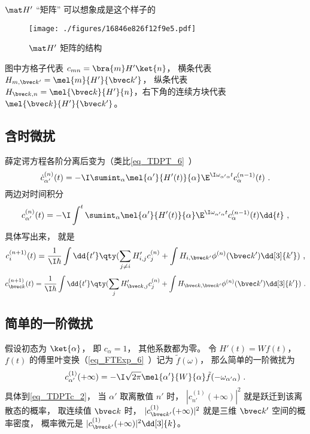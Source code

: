 $\mat H'$  “矩阵” 可以想象成是这个样子的
\begin{figure}[ht]
\centering
\texttt{[image: ./figures/16846e826f12f9e5.pdf]}
\caption{$\mat H'$ 矩阵的结构} \label{fig_TDPTc_1}
\end{figure}
图中方格子代表 $c_{mn} = \bra{m} H' \ket{n}$， 横条代表 $H_{m,\bvec k'} = \mel{m}{H'}{\bvec k'}$，  纵条代表 $H_{\bvec k, n} = \mel{\bvec k}{H'}{n}$，右下角的连续方块代表 $\mel{\bvec k}{H'}{\bvec k'}$。

\subsection{含时微扰}
薛定谔方程各阶分离后变为（类比\autoref{eq_TDPT_6}~）
\begin{equation}
\dot c_{\alpha'}^{(n)}(t) = -\I \sumint_\alpha \mel{\alpha'}{H'(t)}{\alpha} \E^{\I \omega_{\alpha'\alpha} t} c_{\alpha}^{(n-1)}(t)~.
\end{equation}
两边对时间积分
\begin{equation}
c_{\alpha'}^{(n)}(t) = -\I \int^t \sumint_\alpha \mel{\alpha'}{H'(t)}{\alpha} \E^{\I \omega_{\alpha'\alpha} t} c_{\alpha}^{(n-1)}(t) \dd{t}~,
\end{equation}
具体写出来， 就是
\begin{equation}
c_i^{(n + 1)}(t) = \frac{1}{\I\hbar} \int \dd{t'} \qty(\sum_{j \ne i} H'_{i,j} c_j^{(n)} + \int H_{i,\bvec k'} \phi ^{(n)}(\bvec k') \dd[3]{k'} )~,
\end{equation}
\begin{equation}
c^{(n+1)}_{\bvec k}(t) = \frac{1}{\I\hbar} \int \dd{t'} \qty(\sum_j H'_{\bvec k,j} c_j^{(n)} + \int H_{\bvec k,\bvec k'} \phi ^{(n)}(\bvec k') \dd[3]{k'})~.
\end{equation}

\subsection{简单的一阶微扰}
假设初态为 $\ket{\alpha}$， 即 $c_\alpha = 1$， 其他系数都为零。 令 $H'(t) = W f(t)$， $f(t)$ 的傅里叶变换（\autoref{eq_FTExp_6}~）记为 $\tilde f(\omega)$， 那么简单的一阶微扰为
\begin{equation}\label{eq_TDPTc_1}
c_{\alpha'}^{(1)}(+\infty) = -\I\sqrt{2\pi} \mel{\alpha'}{W}{\alpha} \tilde f(-\omega_{\alpha'\alpha})~.
\end{equation}
具体到\autoref{eq_TDPTc_2}， 当 $\alpha'$ 取离散值 $n'$ 时， $|c_{n'}^{(1)}(+\infty)|^2$ 就是跃迁到该离散态的概率， 取连续值 $\bvec k$ 时， $|c_{\bvec k'}^{(1)}(+\infty)|^2$ 就是三维 $\bvec k'$ 空间的概率密度， 概率微元是 $|c_{\bvec k'}^{(1)}(+\infty)|^2\dd[3]{k}$。

